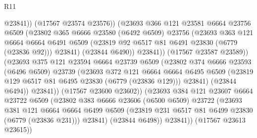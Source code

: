\begin{lexlean}{R11}
\begin{coremodule}
                              @23841))
                          (@17567 @23574 @23576))
                        (@23693
                          @366
                          @121
                          @23581
                          @6664
                          @23756
                          @6509
                          (@23802
                            @365
                            @6666
                            @23580
                            (@6492 @6509)
                            @23756
                            (@23693
                              @363
                              @121
                              @6664
                              @6664
                              @6491
                              @6509
                              (@23819 @92 @6517 @81 @6491 @23830 (@6779 (@23836 @92)))
                              @23841)
                            (@23844 @6490))
                          @23841))
                      (@17567 @23587 @23589))
                    (@23693
                      @375
                      @121
                      @23594
                      @6664
                      @23739
                      @6509
                      (@23802
                        @374
                        @6666
                        @23593
                        (@6496 @6509)
                        @23739
                        (@23693
                          @372
                          @121
                          @6664
                          @6664
                          @6495
                          @6509
                          (@23819 @129 @6517 @81 @6495 @23830 (@6779 (@23836 @129)))
                          @23841)
                        (@23844 @6494))
                      @23841))
                  (@17567 @23600 @23602))
                (@23693
                  @384
                  @121
                  @23607
                  @6664
                  @23722
                  @6509
                  (@23802
                    @383
                    @6666
                    @23606
                    (@6500 @6509)
                    @23722
                    (@23693
                      @381
                      @121
                      @6664
                      @6664
                      @6499
                      @6509
                      (@23819 @231 @6517 @81 @6499 @23830 (@6779 (@23836 @231)))
                      @23841)
                    (@23844 @6498))
                  @23841))
              (@17567 @23613 @23615))

\end{coremodule}
\end{lexlean}
